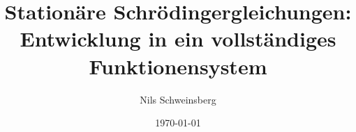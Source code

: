 


\title{Stationäre Schrödingergleichungen: Entwicklung in ein
  vollständiges Funktionensystem}

\author{Nils Schweinsberg}
\subject{Computational Physics Praktikum, WS 2012/13}

\publishers{Betreut durch E. van Dalen}

\date{\today}



\maketitle
\tableofcontents
\newpage




%


%
%


